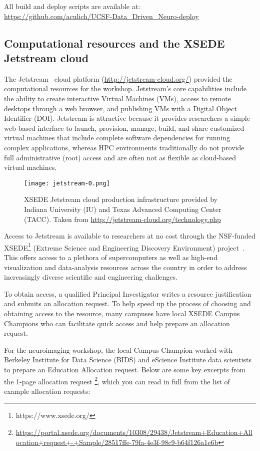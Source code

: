 All build and deploy scripts are available at:\\
\indent\indent\url{https://github.com/aculich/UCSF-Data_Driven_Neuro-deploy}

\subsection{Computational resources and the XSEDE Jetstream cloud}

The Jetstream~\cite{Stewart2015Jetstream} cloud platform
(\url{http://jetstream-cloud.org/}) provided the computational resources for the
workshop. Jetstream's core capabilities include the ability to create
interactive Virtual Machines (VMs), access to remote desktops through a web
browser, and publishing VMs with a Digital Object Identifier (DOI). Jetstream is
attractive because it provides researchers a simple web-based
interface\cite{NiravCyberinfra2016} to launch, provision, manage, build, and
share customized virtual machines that include complete software dependencies
for running complex applications, whereas HPC environments traditionally do not
provide full administrative (root) access and are often not as flexible as
cloud-based virtual machines.

\begin{figure}[h]
\centering
\texttt{[image: jetstream-0.png]}
\caption{XSEDE Jetstream cloud production infrastructure provided by Indiana University (IU) and Texas Advanced Computing Center (TACC). Taken from \url{http://jetstream-cloud.org/technology.php}}
\end{figure}

Access to Jetstream is available to researchers at no cost through the
NSF-funded XSEDE\footnote{https://www.xsede.org/} (Extreme Science and
Engineering Discovery Environment) project~\cite{Towns2014XSEDE}. This
offers access to a plethora of supercomputers as well as high-end
visualization and data-analysis resources across the
country in order to address increasingly diverse scientific and
engineering challenges.

To obtain access, a qualified Principal Investigator writes a resource
justification and submits an allocation request. To help speed up the
process of choosing and obtaining access to the resource, many campuses
have local XSEDE Campus Champions who can facilitate quick access and
help prepare an allocation request.

For the neuroimaging workshop, the local Campus Champion worked with Berkeley
Institute for Data Science (BIDS) and eScience Institute data scientists to
prepare an Education Allocation request. Below are some key excerpts from the
1-page allocation request \footnote{\url{https://portal.xsede.org/documents/10308/29438/Jetstream+Education+Allocation+request+-+Sample/28517ffe-79fa-4e3f-98c9-b64f126a1e6b}},
which you can read in full from the list of example allocation requests:

